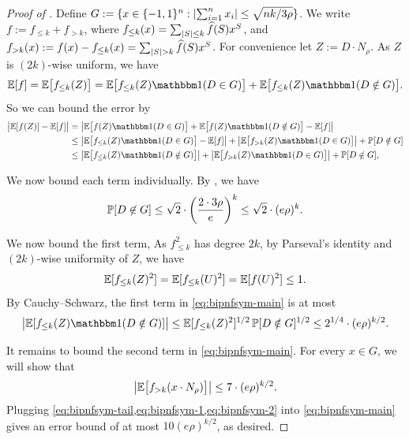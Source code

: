 \documentclass[10pt,a4paper]{article}
\theoremstyle{definition}
\renewcommand{\Pr}{\mathop{\mathbb{P}\/}}
\newcommand{\E}{\mathop{\mathbb{E}\/}}
\newcommand{\bbone}{\mathbbm 1}
\newcommand{\Id}{\bbone}
\newcommand{\wh}[1]{\widehat{#1}}
\newcommand{\pmo}{\{-1,1\}}
\newcommand{\hf}{\wh{f}}
\DeclarePairedDelimiter\abs{\lvert}{\rvert}
\begin{document}
\begin{proof}[Proof of ]
  Define $G := \{ x \in \pmo^n: \abs{\sum_{i=1}^n x_i} \le \sqrt{nk/3\rho} \}$.
  We write $f := f_{\le k} + f_{>k}$, where $f_{\le k}(x) = \sum_{\abs{S}\le k} \hf(S) x^S$, and $f_{>k}(x) := f(x) - f_{\le k}(x) = \sum_{\abs{S} > k} \hf(S) x^S$.
  For convenience let $Z:= D \cdot N_\rho$.
  As $Z$ is $(2k)$-wise uniform, we have
  \begin{align*}
      \E [f] = \E\bigl[f_{\le k}(Z) \bigr]  = \E\bigl[f_{\le k}(Z) \Id (D\in G) \bigr] +  \E\bigl[f_{\le k}(Z) \Id (D\notin G) \bigr].
  \end{align*}
  So we can bound the error by
  \begin{align}
    \abs[\big]{ \E[f(Z)] - \E[f] }
    &=  \abs[\big]{ \E\bigl[f(Z) \Id(D \in G) \bigr] +\E\bigl[f(Z) \Id( D\notin G)\bigr] - \E[f]  } \nonumber  \\
    &\le \abs[\big]{ \E\bigl[f_{\le k}(Z) \Id(D \in G)\bigr] - \E[f]  } +\abs[\big]{\E\bigl[f_{>k}(Z) \Id(D \in G)\bigr]} + \Pr [D \notin G] \nonumber \\
    &\le \abs[\big]{ \E\bigl[f_{\le k}(Z) \Id(D \notin G) \bigr]  }  + \abs[\big]{\E\bigl[f_{>k}(Z) \Id(D \in G)\bigr]} + \Pr[D \notin G] \label{eq:bipnfsym-main} ,
  \end{align}

  We now bound each term individually.
  By , we have
  \begin{align} \label{eq:bipnfsym-tail}
    \Pr[ D \not\in G ]
    \le \sqrt{2} \cdot \left( \frac{2 \cdot 3\rho}{e} \right)^k 
    \le \sqrt{2} \cdot (e\rho)^k .
  \end{align}

  We now bound the first term, 
  As $f_{\le k}^2$ has degree $2k$, by Parseval's identity and $(2k)$-wise uniformity of $Z$, we have
  \[
    \E[f_{\le k}(Z)^2]
    = \E[f_{\le k}(U)^2]
    = \E[f(U)^2]
    \le 1 .
  \]
  By Cauchy--Schwarz, the first term in \cref{eq:bipnfsym-main} is at most
  \begin{align} \label{eq:bipnfsym-1}
    \abs[\big]{ \E[f_{\le k}(Z) \Id (D\notin G) ]  }
    \le \E[f_{\leq k}(Z)^2 ]^{1/2} \Pr[D \notin G]^{1/2}
    \le 2^{1/4} \cdot (e \rho)^{k/2} .
  \end{align}

  It remains to bound the second term in \cref{eq:bipnfsym-main}.
  For every $x \in G$,  we will show that
  \begin{align} \label{eq:bipnfsym-2}
    \abs[\big]{\E\bigl[f_{>k}(x \cdot N_\rho)\bigr]}
    \le 7 \cdot (e\rho)^{k/2} .
  \end{align}
  Plugging \cref{eq:bipnfsym-tail,eq:bipnfsym-1,eq:bipnfsym-2} into \cref{eq:bipnfsym-main} gives an error bound of at most $10 (e\rho)^{k/2}$, as desired.


\end{proof}
\end{document}
